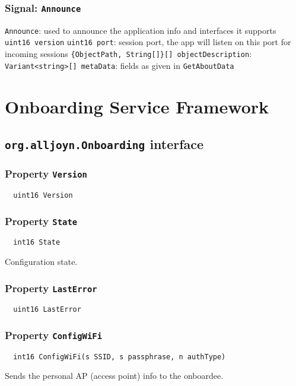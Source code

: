 \documentclass{note}
\begin{document}
\subsubsection{Signal: {\bf\texttt{Announce}}}
  \bit
  \w \verb+Announce+: used to announce the application info and interfaces
   it supports
     \bit
     \w \verb+uint16 version+
     \w \verb+uint16 port+: session port, the app will listen on this port for
     incoming sessions
     \w \verb+{ObjectPath, String[]}[] objectDescription+:
     \w \verb+Variant<string>[] metaData+: fields as given in \verb+GetAboutData+
     \eit
  \eit



\section{Onboarding Service Framework}
\subsection{{\bf\texttt{org.alljoyn.Onboarding}} interface}
\subsubsection{Property {\bf\texttt{Version}}}
\begin{verbatim}
  uint16 Version
\end{verbatim}
\subsubsection{Property {\bf\texttt{State}}}
\begin{verbatim}
  int16 State
\end{verbatim}
Configuration state.
\subsubsection{Property {\bf\texttt{LastError}}}
\begin{verbatim}
  uint16 LastError
\end{verbatim}

\subsubsection{Property {\bf\texttt{ConfigWiFi}}}
\begin{verbatim}
  int16 ConfigWiFi(s SSID, s passphrase, n authType)
\end{verbatim}
Sends the personal AP (access point) info to the onboardee.
\end{document}
